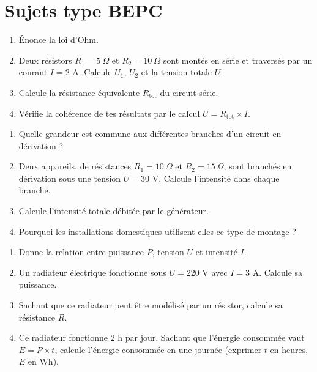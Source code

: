 \section{Sujets type BEPC}

\begin{enumerate}[label=\arabic*)]
\item Énonce la loi d'Ohm.
\item Deux résistors $R_1=5\ \Omega$ et $R_2=10\ \Omega$ sont montés en série et traversés
par un courant $I=2$ A. Calcule $U_1$, $U_2$ et la tension totale $U$.
\item Calcule la résistance équivalente $R_{\text{tot}}$ du circuit série.
\item Vérifie la cohérence de tes résultats par le calcul $U=R_{\text{tot}}\times I$.
\end{enumerate}

\begin{enumerate}[label=\arabic*)]
\item Quelle grandeur est commune aux différentes branches d'un circuit en dérivation ?
\item Deux appareils, de résistances $R_1=10\ \Omega$ et $R_2=15\ \Omega$, sont branchés en
dérivation sous une tension $U=30$ V. Calcule l'intensité dans chaque branche.
\item Calcule l'intensité totale débitée par le générateur.
\item Pourquoi les installations domestiques utilisent-elles ce type de montage ?
\end{enumerate}

\begin{enumerate}[label=\arabic*)]
\item Donne la relation entre puissance $P$, tension $U$ et intensité $I$.
\item Un radiateur électrique fonctionne sous $U=220$ V avec $I=3$ A. Calcule sa puissance.
\item Sachant que ce radiateur peut être modélisé par un résistor, calcule sa résistance
$R$.
\item Ce radiateur fonctionne $2$ h par jour. Sachant que l'énergie consommée vaut
$E=P\times t$, calcule l'énergie consommée en une journée (exprimer $t$ en heures, $E$ en
Wh).
\end{enumerate}

